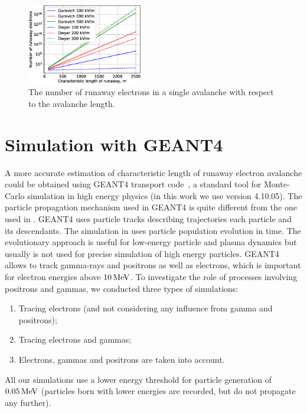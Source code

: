 \documentclass[doublecol,linenumbers]{epl2} %
\begin{document}
	\begin{figure}[h]
		\centering
		\includegraphics[width=0.45\textwidth]{figures/gurevich.eps}
		\caption{The number of runaway electrons in a single avalanche with respect to the avalanche length.}
		\label{fig:gur}
	\end{figure}
	
	\section{Simulation with GEANT4}
	\label{sec:swg}
	A more accurate estimation of characteristic length of runaway electron avalanche could be obtained using GEANT4 transport code~\cite{Geant2003,Geant2006, Geant2016}, a standard tool for Monte-Carlo simulation in high energy physics (in this work we use version 4.10.05). The particle propagation mechanism used in GEANT4 is quite different from the one used in \cite{Oreshkin_2018}. GEANT4 uses particle tracks describing trajectories each particle and its descendants. The simulation in \cite{Oreshkin_2018} uses particle population evolution in time. The evolutionary approach is useful for low-energy particle and plasma dynamics but usually is not used for precise simulation of high energy particles. GEANT4 allows to track gamma-rays and positrons as well as electrons, which is important for electron energies above $10\un{MeV}$. To investigate the role of processes involving positrons and gammas, we conducted three types of simulations: 
	\begin{enumerate}
		\item Tracing electrons (and not considering any influence from gamma and positrons);
		\item Tracing electrons and gammas;
		\item Electrons, gammas and positrons are taken into account.
	\end{enumerate}
	
	All our simulations use a lower energy threshold for particle generation of $0.05\un{MeV}$ (particles born with lower energies are recorded, but do not propagate any further).
	
\end{document}

